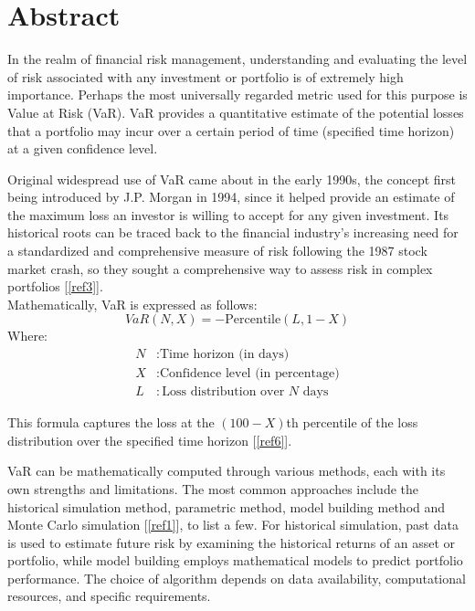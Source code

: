 \documentclass{article}
\begin{document}
\newpage

\tableofcontents

\newpage

\section{Abstract}
In the realm of financial risk management, understanding and evaluating the level of risk associated with any investment or portfolio is of extremely high importance. Perhaps the most universally regarded metric used for this purpose is Value at Risk (VaR). VaR provides a quantitative estimate of the potential losses that a portfolio may incur over a certain period of time (specified time horizon) at a given confidence level. \\\vspace{0.3cm}

Original widespread use of VaR came about in the early 1990s, the concept first being introduced by J.P. Morgan in 1994, since it helped provide an estimate of the maximum loss an investor is willing to accept for any given investment. Its historical roots can be traced back to the financial industry's increasing need for a standardized and comprehensive measure of risk following the 1987 stock market crash, so they sought a comprehensive way to assess risk in complex portfolios [\ref{ref3}]. \\

Mathematically, VaR is expressed as follows:
\begin{equation}
VaR(N, X) = -\text{Percentile}(L, 1 - X)
\end{equation}
Where:
\begin{align*}
N & : \text{Time horizon (in days)} \\
X & : \text{Confidence level (in percentage)} \\
L & : \text{Loss distribution over } N \text{ days}
\end{align*}

This formula captures the loss at the \((100-X)\)th percentile of the loss distribution over the specified time horizon [\ref{ref6}]. \\\vspace{0.3cm}

VaR can be mathematically computed through various methods, each with its own strengths and limitations. The most common approaches include the historical simulation method, parametric method, model building method and Monte Carlo simulation [\ref{ref1}], to list a few. For historical simulation, past data is used to estimate future risk by examining the historical returns of an asset or portfolio, while model building employs mathematical models to predict portfolio performance. The choice of algorithm depends on data availability, computational resources, and specific requirements.\\\vspace{0.3cm}
\end{document}
